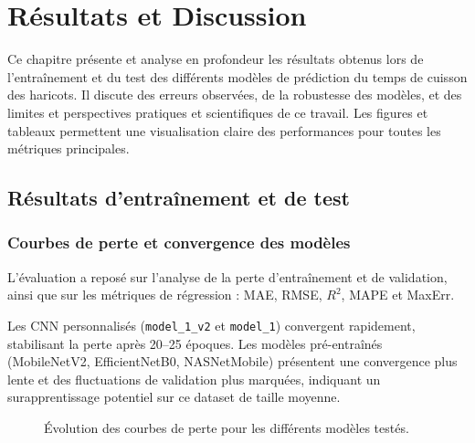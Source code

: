 \chapter{Résultats et Discussion}
\label{chap:resultats_discussion}

Ce chapitre présente et analyse en profondeur les résultats obtenus lors de l’entraînement et du test des différents modèles de prédiction du temps de cuisson des haricots. Il discute des erreurs observées, de la robustesse des modèles, et des limites et perspectives pratiques et scientifiques de ce travail. Les figures et tableaux permettent une visualisation claire des performances pour toutes les métriques principales.

\section{Résultats d’entraînement et de test}
\label{sec:resultats_train_test}

\subsection{Courbes de perte et convergence des modèles}
\label{subsec:loss_curves}

L’évaluation a reposé sur l’analyse de la perte d’entraînement et de validation, ainsi que sur les métriques de régression : MAE, RMSE, $R^2$, MAPE et MaxErr.  

Les CNN personnalisés (\texttt{model\_1\_v2} et \texttt{model\_1}) convergent rapidement, stabilisant la perte après 20–25 époques. Les modèles pré-entraînés (MobileNetV2, EfficientNetB0, NASNetMobile) présentent une convergence plus lente et des fluctuations de validation plus marquées, indiquant un surapprentissage potentiel sur ce dataset de taille moyenne.

\begin{figure}[h!]
\centering
{}
\caption{Évolution des courbes de perte pour les différents modèles testés.}
\label{fig:loss_curves}
\end{figure}

